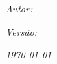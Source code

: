 \begin{center}
\textbf{\large{}}
\par\end{center}{\large \par}

\vspace{6cm}


\begin{center}
{\LARGE{}\reporttitle}
\par\end{center}{\LARGE \par}

\vfill{}



\textit{\emph{\large{}Autor: \autor}}{\large \par}


\textit{\emph{\large{}Versão: \version}}{\large \par}

\vspace{1cm}


\begin{flushright}
\textit{\emph{\today}}
\par\end{flushright}

\pagebreak{}
